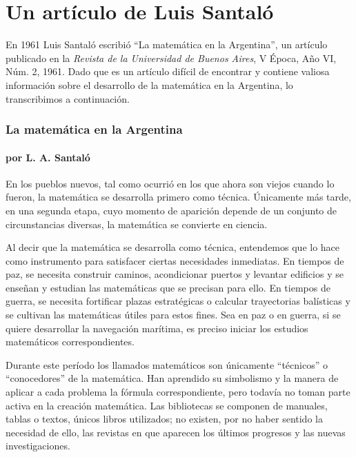 \chapter{Un artículo de Luis Santaló}

\pagestyle{plain}
\fancyhf{}
\fancyfoot[CE,CO]{\leftmark}
\fancyfoot[LE,RO]{\thepage}

En 1961 Luis Santaló escribió 
``La matemática en la Argentina'', un artículo 
publicado en la \emph{Revista de la
Universidad de Buenos Aires}, V Época, Año VI, Núm. 2, 1961. 
Dado que es un artículo difícil de encontrar y contiene valiosa información
sobre el desarrollo de la matemática en la Argentina, lo transcribimos a
continuación. 

\subsection*{La matemática en la Argentina}
\subsubsection*{por L. A. Santaló}

En los pueblos nuevos, tal como ocurrió en los que ahora son viejos cuando lo
fueron, la matemática se desarrolla primero como técnica. Únicamente más tarde,
en una segunda etapa, cuyo momento de aparición depende de un conjunto de
circunstancias diversas, la matemática se convierte en ciencia.

Al decir que la matemática se desarrolla como técnica, entendemos que lo hace
como instrumento para satisfacer ciertas necesidades inmediatas. En tiempos de
paz, se necesita construir caminos, acondicionar puertos y levantar edificios y
se enseñan y estudian las matemáticas que se precisan para ello. En tiempos de
guerra, se necesita fortificar plazas estratégicas o calcular trayectorias
balísticas y se cultivan las matemáticas útiles para estos fines. Sea en paz o
en guerra, si se quiere desarrollar la navegación marítima, es preciso iniciar
los estudios matemáticos correspondientes. 

Durante este período los llamados matemáticos son únicamente ``técnicos'' o
``conocedores'' de la matemática. Han aprendido su simbolismo y la manera de
aplicar a cada problema la fórmula correspondiente, pero todavía no toman parte
activa en la creación matemática. Las bibliotecas se componen de manuales,
tablas o textos, únicos libros utilizados; no existen, por no haber sentido la
necesidad de ello, las revistas en que aparecen los últimos progresos y las
nuevas investigaciones.

